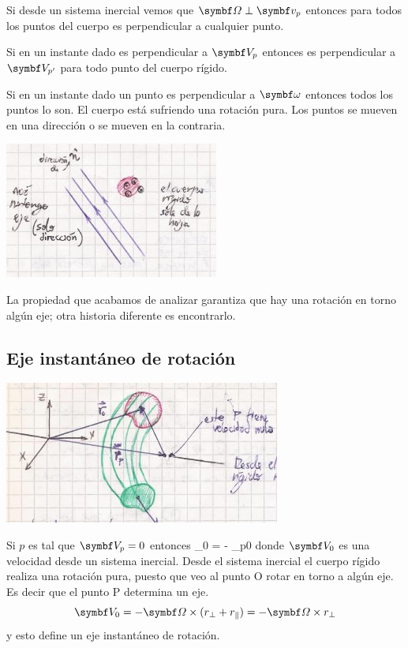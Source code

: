 \documentclass[10pt,oneside]{CBFT_book}
\begin{document}
Si desde un sistema inercial vemos que $\vb{\Omega} \perp \vb{v}_p$ entonces para todos los puntos del 
cuerpo \vb{\Omega}  es perpendicular a cualquier punto.

Si en un instante dado \vb{\Omega} es perpendicular a $\vb{V}_p$ entonces \vb{\Omega} es perpendicular a 
$\vb{V}_{p'}$ para todo punto del cuerpo rígido.

Si en un instante dado un punto es perpendicular a $\vb{\omega}$ entonces todos los puntos lo son.
El cuerpo está sufriendo una rotación pura. Los puntos se mueven en una dirección o se mueven en la contraria.

\includegraphics[scale=0.4]{images/fig_mc_rigid_body_vel5.jpg}

La propiedad que acabamos de analizar garantiza que hay una rotación en torno algún eje; otra
historia diferente es encontrarlo.

\subsection{Eje instantáneo de rotación}


\includegraphics[scale=0.4]{images/fig_mc_rigid_body_ejerot.jpg}
 
Si $p$ es tal que $\vb{V}_p = 0$ entonces
\be
	_0 = - \vb{\Omega} \times {}_{p0}
	\label{condicion_eje}
\ee
donde $\vb{V}_0$ es una velocidad desde un sistema inercial.
Desde el sistema inercial el cuerpo rígido realiza una rotación pura, puesto que veo al
punto O rotar en torno a algún eje.
Es decir que el punto P determina un eje.
\[
	\vb{V}_0 = - \vb{\Omega} \times ( r_{\perp} + r_{\parallel} ) = -\vb{\Omega} \times  r_{\perp} 
\]
y esto define un eje instantáneo de rotación.
\end{document}
